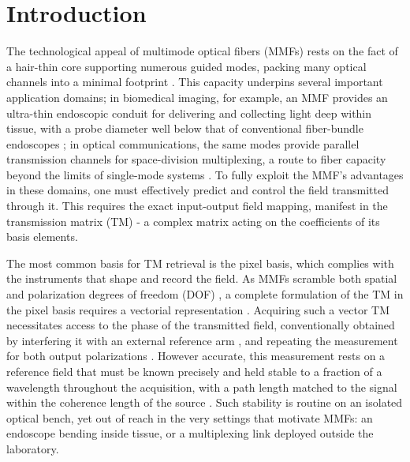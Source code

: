 \documentclass{article}
\begin{document}
\section{Introduction}
The technological appeal of multimode optical fibers (MMFs) rests on the fact of a hair-thin core supporting numerous guided modes, packing many optical channels into a minimal footprint \cite{applications_review, puttnam2021}. This capacity underpins several important application domains; in biomedical imaging, for example, an MMF provides an ultra-thin endoscopic conduit for delivering and collecting light deep within tissue, with a probe diameter well below that of conventional fiber-bundle endoscopes \cite{deep_brain_in_vivo,ntziachristos2010, scanner_free, imaging_example, seeing_through_chaos}; in optical communications, the same modes provide parallel transmission channels for space-division multiplexing, a route to fiber capacity beyond the limits of single-mode systems \cite{multiplexing_example, puttnam2021}. To fully exploit the MMF's advantages in these domains, one must effectively predict and control the field transmitted through it. This requires the exact input-output field mapping, manifest in the transmission matrix (TM) - a complex matrix acting on the coefficients of its basis elements. 

The most common basis for TM retrieval is the pixel basis, which complies with the instruments that shape and record the field. As MMFs scramble both spatial and polarization degrees of freedom (DOF) \cite{xiong2017}, a complete formulation of the TM in the pixel basis requires a vectorial representation \cite{tripathi2012}. Acquiring such a vector TM necessitates access to the phase of the transmitted field, conventionally obtained by interfering it with an external reference arm \cite{seeing_through_chaos, yu2013}, and repeating the measurement for both output polarizations \cite{tripathi2012, xie2017}. However accurate, this measurement rests on a reference field that must be known precisely and held stable to a fraction of a wavelength throughout the acquisition, with a path length matched to the signal within the coherence length of the source \cite{goodman2015}. Such stability is routine on an isolated optical bench, yet out of reach in the very settings that motivate MMFs: an endoscope bending inside tissue, or a multiplexing link deployed outside the laboratory.
\end{document}
